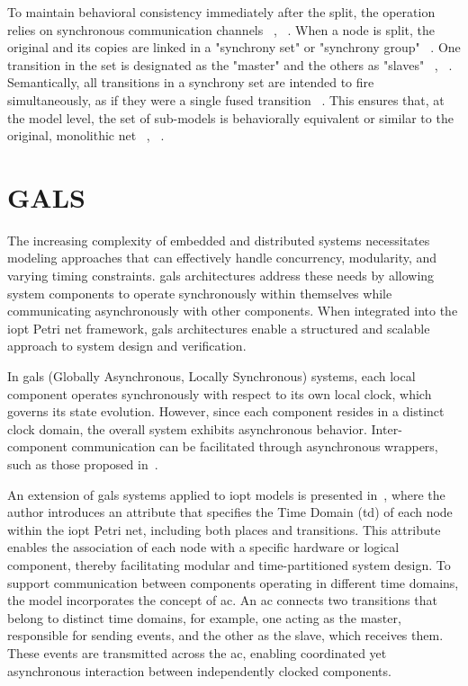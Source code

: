\begin{itemize}
To maintain behavioral consistency immediately after the split, the operation relies on synchronous communication channels ~\cite{splitting}, ~\cite{co-design}. When a node is split, the original and its copies are linked in a "synchrony set" or "synchrony group" ~\cite{co-design}. One transition in the set is designated as the "master" and the others as "slaves" ~\cite{splitting}, ~\cite{co-design}. Semantically, all transitions in a synchrony set are intended to fire simultaneously, as if they were a single fused transition ~\cite{splitting}. This ensures that, at the model level, the set of sub-models is behaviorally equivalent or similar to the original, monolithic net ~\cite{splitting}, ~\cite{co-design}.

\end{itemize}



\section{GALS}
\label{sec:gals}


The increasing complexity of embedded and distributed systems necessitates modeling approaches that can effectively handle concurrency, modularity, and varying timing constraints. \gls{gals} architectures address these needs by allowing system components to operate synchronously within themselves while communicating asynchronously with other components. When integrated into the \gls{iopt} Petri net framework, \gls{gals} architectures enable a structured and scalable approach to system design and verification.

In \gls{gals} (Globally Asynchronous, Locally Synchronous) systems, each local component operates synchronously with respect to its own local clock, which governs its state evolution. However, since each component resides in a distinct clock domain, the overall system exhibits asynchronous behavior. Inter-component communication can be facilitated through asynchronous wrappers, such as those proposed in~\cite{galsborman}.


An extension of \gls{gals} systems applied to \gls{iopt} models is presented in~\cite{galsactd}, where the author introduces an attribute that specifies the Time Domain (\gls{td}) of each node within the \gls{iopt} Petri net, including both places and transitions. This attribute enables the association of each node with a specific hardware or logical component, thereby facilitating modular and time-partitioned system design.
To support communication between components operating in different time domains, the model incorporates the concept of \gls{ac}. An \gls{ac} connects two transitions that belong to distinct time domains, for example, one acting as the master, responsible for sending events, and the other as the slave, which receives them. These events are transmitted across the \gls{ac}, enabling coordinated yet asynchronous interaction between independently clocked components.


